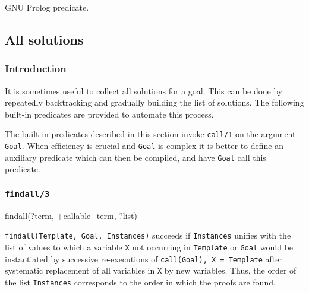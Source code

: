 GNU Prolog predicate.

\subsection{All solutions}

\subsubsection{Introduction}
\label{Introduction:(All-solutions)}
It is sometimes useful to collect all solutions for a goal. This can be done
by repeatedly backtracking and gradually building the list of solutions. The
following built-in predicates are provided to automate this process. 

The built-in predicates described in this section invoke \texttt{call/1}
 on the argument \texttt{Goal}. When efficiency is crucial
and \texttt{Goal} is complex it is better to define an auxiliary predicate
which can then be compiled, and have \texttt{Goal} call this predicate.

\subsubsection{\texttt{findall/3}}

\begin{TemplatesOneCol}
findall(?term, +callable\_term, ?list)

\end{TemplatesOneCol}

\Description

\texttt{findall(Template, Goal, Instances)} succeeds if \texttt{Instances}
unifies with the list of values to which a variable \texttt{X} not occurring
in \texttt{Template} or \texttt{Goal} would be instantiated by successive
re-executions of \texttt{call(Goal), X = Template} after systematic
replacement of all variables in \texttt{X} by new variables. Thus, the order
of the list \texttt{Instances} corresponds to the order in which the proofs
are found.

\begin{PlErrors}





\end{PlErrors}

